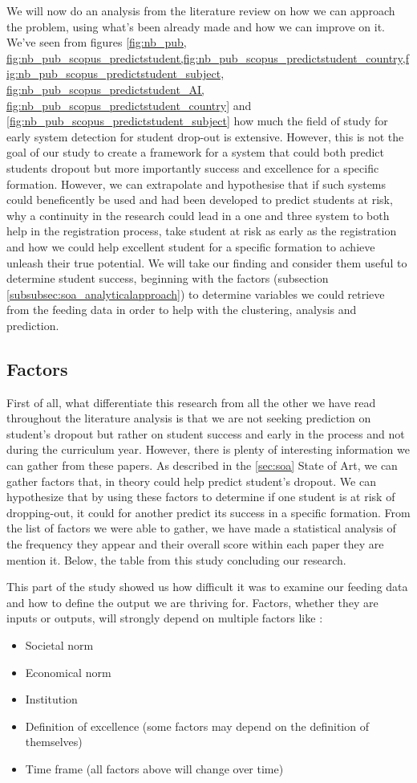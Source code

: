 \documentclass[../main.tex]{subfiles}
\begin{document}
We will now do an analysis from the literature review on how we can approach the problem, using what's been already made and how we can improve on it.
We've seen from figures \ref{fig:nb_pub, fig:nb_pub_scopus_predictstudent,fig:nb_pub_scopus_predictstudent_country,fig:nb_pub_scopus_predictstudent_subject, fig:nb_pub_scopus_predictstudent_AI, fig:nb_pub_scopus_predictstudent_country} and \ref{fig:nb_pub_scopus_predictstudent_subject} how much the field of study for early system detection for student drop-out is extensive. However, this is not the goal of our study to create a framework for a system that could both predict students dropout but more importantly success and excellence for a specific formation. 
However, we can extrapolate and hypothesise that if such systems could beneficently be used and had been developed to predict students at risk, why a continuity in the research could lead in a one and three system to both help in the registration process, take student at risk as early as the registration and how we could help excellent student for a specific formation to achieve unleash their true potential.
We will take our finding and consider them useful to determine student success, beginning with the factors (subsection \ref{subsubsec:soa_analyticalapproach}) to determine variables we could retrieve from the feeding data in order to help with the clustering, analysis and prediction.

\subsection{Factors}
\label{subsec:analysis_factors}
First of all, what differentiate this research from all the other we have read throughout the literature analysis is that we are not seeking prediction on student's dropout but rather on student success and early in the process and not during the curriculum year. However, there is plenty of interesting information we can gather from these papers. As described in the \ref{sec:soa} State of Art, we can gather factors that, in theory could help predict student's dropout. We can hypothesize that by using these factors to determine if one student is at risk of dropping-out, it could for another predict its success in a specific formation. From the list of factors we were able to gather, we have made a statistical analysis of the frequency they appear and their overall score within each paper they are mention it. Below, the table from this study concluding our research.

This part of the study showed us how difficult it was to examine our feeding data and how to define the output we are thriving for. Factors, whether they are inputs or outputs, will strongly depend on multiple factors like :
\begin{itemize}
    \item Societal norm
    \item Economical norm
    \item Institution
    \item Definition of excellence (some factors may depend on the definition of themselves)
    \item Time frame (all factors above will change over time)
\end{itemize}
\end{document}
